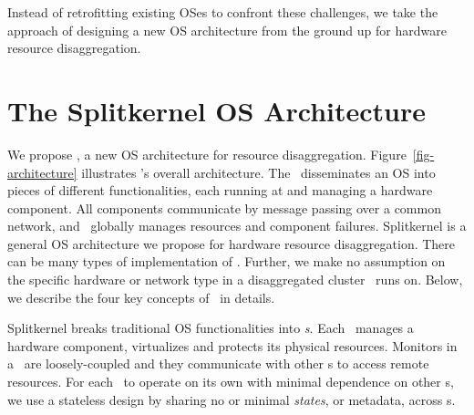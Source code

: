 \documentclass[10pt,times,twocolumn]{z2-article}
\begin{document}
Instead of retrofitting existing OSes to confront these challenges,
we take the approach of designing a new OS architecture from the ground up for hardware resource disaggregation.
\section{The Splitkernel OS Architecture}
\label{sec:design}

We propose {\em \splitkernel}, a new OS architecture for resource disaggregation. 
Figure~\ref{fig-architecture} illustrates \splitkernel's overall architecture.
The \splitkernel\ disseminates an OS into pieces of different functionalities,
each running at and managing a hardware component.
All components communicate by message passing over a common network,
and \splitkernel\ globally manages resources and component failures.
Splitkernel is a general OS architecture we propose for hardware resource disaggregation.
There can be many types of implementation of \splitkernel.
Further, we make no assumption on the specific hardware or network type in a disaggregated cluster \splitkernel\ runs on.
Below, we describe the four key concepts of \splitkernel\ in details.

Splitkernel breaks traditional OS functionalities into {\em \microos{}s}.
Each \microos\ manages a hardware component, virtualizes and protects its physical resources.
Monitors in a \splitkernel\ are loosely-coupled and 
they communicate with other \microos{}s to access remote resources. 
For each \microos\ to operate on its own with minimal dependence on other \microos{}s,
we use a stateless design by sharing no or minimal {\em states}, or metadata,
across \microos{}s.
\end{document}
